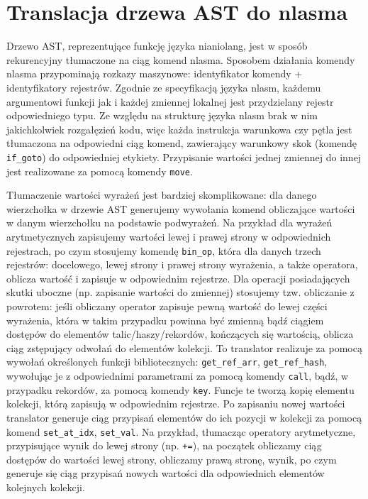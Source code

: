 \documentclass[licencjacka]{pracamgr}
\begin{document}
\section{Translacja drzewa AST do nlasma}
\label{sec:translation}
Drzewo AST, reprezentujące funkcję języka nianiolang, jest w sposób rekurencyjny tłumaczone na ciąg komend nlasma. Sposobem działania 
komendy nlasma przypominają rozkazy maszynowe: identyfikator komendy + identyfikatory rejestrów. Zgodnie ze specyfikacją języka nlasm, każdemu argumentowi funkcji jak 
i każdej zmiennej lokalnej jest przydzielany rejestr odpowiedniego typu. Ze względu na strukturę języka nlasm brak w nim jakichkolwiek rozgałęzień kodu, 
więc każda instrukcja warunkowa czy pętla jest tłumaczona na odpowiedni ciąg komend, zawierający warunkowy skok (komendę \texttt{if\_goto}) do 
odpowiedniej etykiety. Przypisanie wartości jednej zmiennej do innej jest realizowane za pomocą komendy \texttt{move}. 

Tłumaczenie wartości wyrażeń jest bardziej skomplikowane: dla danego wierzchołka w drzewie AST generujemy wywołania komend obliczające wartości w 
danym wierzchołku na podstawie podwyrażeń. Na przykład dla wyrażeń arytmetycznych zapisujemy wartości lewej i prawej strony w odpowiednich rejestrach, po czym 
stosujemy komendę \texttt{bin\_op}, która dla danych trzech rejestrów: docelowego, lewej strony i prawej strony wyrażenia, a także operatora, oblicza 
wartość i zapisuje w odpowiednim rejestrze. Dla operacji posiadających skutki uboczne (np. zapisanie wartości do zmiennej) stosujemy tzw. obliczanie 
z powrotem: jeśli obliczany operator zapisuje pewną wartość do lewej części wyrażenia, która w takim przypadku powinna być zmienną bądź ciągiem 
dostępów do elementów talic/haszy/rekordów, kończących się wartością, oblicza ciąg zstępujący odwołań do elementów kolekcji. To translator realizuje za 
pomocą wywołań określonych funkcji bibliotecznych: \texttt{get\_ref\_arr}, \texttt{get\_ref\_hash}, wywołując je z odpowiednimi parametrami za pomocą 
komendy \texttt{call}, bądź, w przypadku rekordów, za pomocą komendy \texttt{key}. Funcje te tworzą kopię elementu kolekcji, którą zapisują w 
odpowiednim rejestrze. Po zapisaniu nowej wartości translator generuje ciąg przypisań elementów do ich pozycji w kolekcji za pomocą komend 
\texttt{set\_at\_idx}, \texttt{set\_val}. Na przykład, tłumacząc operatory arytmetyczne, przypisujące wynik do lewej strony (np. \texttt{+=}), na 
początek obliczamy ciąg dostępów do wartości lewej strony, obliczamy prawą stronę, wynik, po czym generuje się ciąg przypisań nowych wartości dla odpowiednich elementów kolejnych 
kolekcji.
\end{document}
